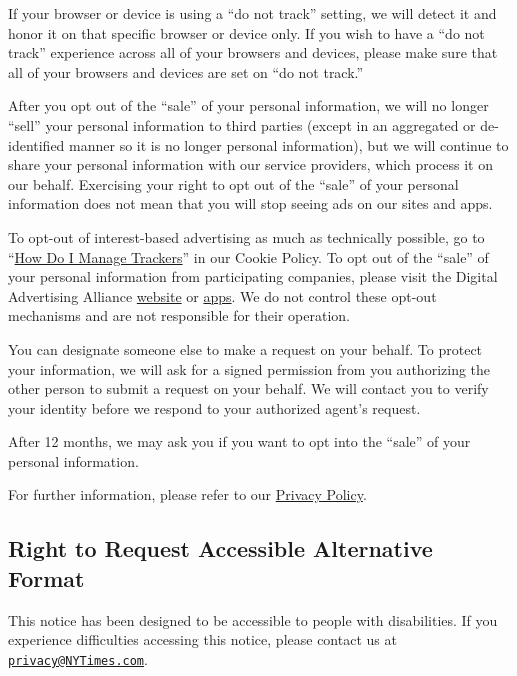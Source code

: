 If your browser or device is using a ``do not track'' setting, we will
detect it and honor it on that specific browser or device only. If you
wish to have a ``do not track'' experience across all of your browsers
and devices, please make sure that all of your browsers and devices are
set on ``do not track.''

After you opt out of the ``sale'' of your personal information, we will
no longer ``sell'' your personal information to third parties (except in
an aggregated or de-identified manner so it is no longer personal
information), but we will continue to share your personal information
with our service providers, which process it on our behalf. Exercising
your right to opt out of the ``sale'' of your personal information does
not mean that you will stop seeing ads on our sites and apps.

To opt-out of interest-based advertising as much as technically
possible, go to
``\href{http://www.nytimes3xbfgragh.onion/privacy/cookie-policy\#how-do-i-manage-trackers}{How
Do I Manage Trackers}'' in our Cookie Policy. To opt out of the ``sale''
of your personal information from participating companies, please visit
the Digital Advertising Alliance
\href{https://optout.privacyrights.info/?c=1}{website} or
\href{https://www.privacyrights.info/appchoices}{apps}. We do not
control these opt-out mechanisms and are not responsible for their
operation.

You can designate someone else to make a request on your behalf. To
protect your information, we will ask for a signed permission from you
authorizing the other person to submit a request on your behalf. We will
contact you to verify your identity before we respond to your authorized
agent's request.

After 12 months, we may ask you if you want to opt into the ``sale'' of
your personal information.

For further information, please refer to our
\href{http://www.nytimes3xbfgragh.onion/privacy/privacy-policy}{Privacy
Policy}.

\hypertarget{right-to-request-accessible-alternative-format}{%
\subsection{Right to Request Accessible Alternative
Format}\label{right-to-request-accessible-alternative-format}}

This notice has been designed to be accessible to people with
disabilities. If you experience difficulties accessing this notice,
please contact us at
\href{mailto:privacy@NYTimes.com}{\nolinkurl{privacy@NYTimes.com}}.

